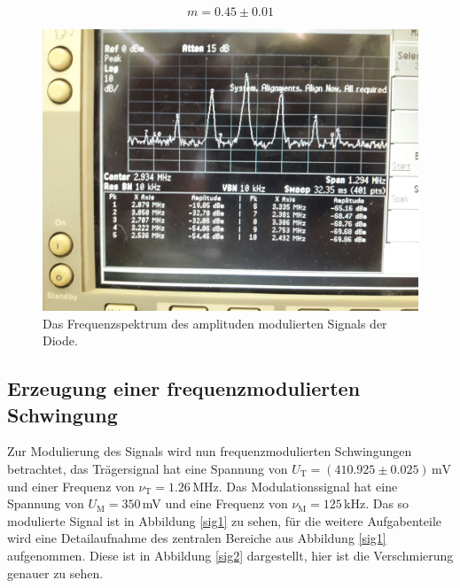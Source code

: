 \begin{equation}
        \label{mod2}
        m=0.45 \pm 0.01
\end{equation}
\begin{figure}
  \centering
  \includegraphics[width=0.7\linewidth]{ressources/photo5384285734183217711.jpg}
  \caption{Das Frequenzspektrum des amplituden modulierten Signals der Diode.}
  \label{spek2}
\end{figure}


\subsection{Erzeugung einer frequenzmodulierten Schwingung}
Zur Modulierung des Signals wird nun frequenzmodulierten Schwingungen betrachtet, das Trägersignal
hat eine Spannung von $U_\text{T}=(410.925\pm 0.025)\,\text{mV}$ und einer Frequenz von
$\nu_\text{T}=1.26 \, \text{MHz}$. Das Modulationssignal hat eine Spannung von
$U_\text{M}=350\,$mV und eine Frequenz von $\nu_\text{M}=125\,$kHz.
Das so modulierte Signal ist in Abbildung \ref{sig1} zu sehen, für die
weitere Aufgabenteile wird eine Detailaufnahme des zentralen Bereiche aus
Abbildung \ref{sig1} aufgenommen. Diese ist in Abbildung \ref{sig2} dargestellt,
hier ist die Verschmierung genauer zu sehen.\\

